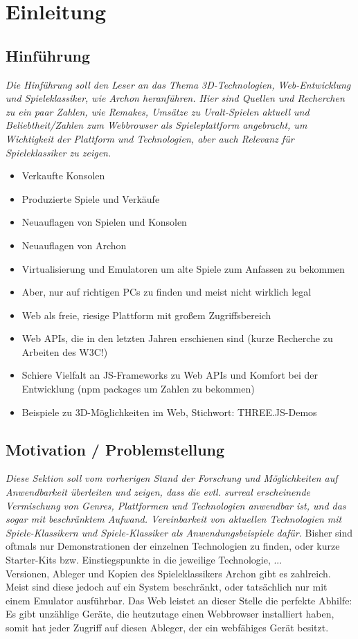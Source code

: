 \chapter{Einleitung}
\label{cha:Einleitung}

\section{Hinführung}
\label{sec:hinfuhrung}

\emph{Die Hinführung soll den Leser an das Thema 3D-Technologien, Web-Entwicklung und Spieleklassiker, wie Archon heranführen. Hier sind Quellen und Recherchen zu ein paar Zahlen, wie Remakes, Umsätze zu Uralt-Spielen aktuell und Beliebtheit/Zahlen zum Webbrowser als Spieleplattform angebracht, um Wichtigkeit der Plattform und Technologien, aber auch Relevanz für Spieleklassiker zu zeigen.}

\begin{itemize}
	\item Verkaufte Konsolen
	\item Produzierte Spiele und Verkäufe
	\item Neuauflagen von Spielen und Konsolen
	\item Neuauflagen von Archon 
	\item Virtualisierung und Emulatoren um alte Spiele zum Anfassen zu bekommen
	\item Aber, nur auf richtigen PCs zu finden und meist nicht wirklich legal
	\item Web als freie, riesige Plattform mit großem Zugriffsbereich
	\item Web APIs, die in den letzten Jahren erschienen sind (kurze Recherche zu Arbeiten des W3C!)
	\item Schiere Vielfalt an JS-Frameworks zu Web APIs und Komfort bei der Entwicklung (npm packages um Zahlen zu bekommen)
	\item Beispiele zu 3D-Möglichkeiten im Web, Stichwort: THREE.JS-Demos
\end{itemize}

\section{Motivation / Problemstellung}
\label{sec:motivation}
\emph{ Diese Sektion soll vom vorherigen Stand der Forschung und Möglichkeiten auf Anwendbarkeit überleiten und zeigen, dass die evtl. surreal erscheinende Vermischung von Genres, Plattformen und Technologien anwendbar ist, und das sogar mit beschränktem Aufwand. Vereinbarkeit von aktuellen Technologien mit Spiele-Klassikern und Spiele-Klassiker als Anwendungsbeispiele dafür.}
Bisher sind oftmals nur Demonstrationen der einzelnen Technologien zu finden, oder kurze Starter-Kits bzw. Einstiegspunkte in die jeweilige Technologie, ...\\
Versionen, Ableger und Kopien des Spieleklassikers Archon gibt es zahlreich. Meist sind diese jedoch auf ein System beschränkt, oder tatsächlich nur mit einem Emulator ausführbar. Das Web leistet an dieser Stelle die perfekte Abhilfe: Es gibt unzählige Geräte, die heutzutage einen Webbrowser installiert haben, somit hat jeder Zugriff auf diesen Ableger, der ein webfähiges Gerät besitzt.

